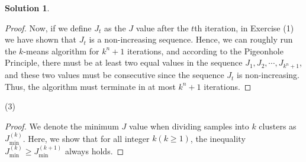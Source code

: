 \documentclass[a4paper,UTF8]{article}
\numberwithin{equation}{section}
\theoremstyle{definition}
\newtheorem*{solution}{Solution}
\begin{document}
\begin{solution}
\begin{proof}
 Now, if we define $J_t$ as the $J$ value after the $t$th iteration, in Exercise (1) we have shown that $J_t$ is a non-increasing sequence. Hence, we can roughly run the $k$-means algorithm for $k^n+1$ iterations, and according to the Pigeonhole Principle, there must be at least two equal values in the sequence $J_1, J_2, \cdots, J_{k^n+1}$, and these two values must be consecutive since the sequence $J_t$ is non-increasing. Thus, the algorithm must terminate in at most $k^n+1$ iterations.
\end{proof}

\item[(3)]
\begin{proof}
We denote the minimum $J$ value when dividing samples into $k$ clusters as $J^{(k)}_{\text{min}}$. Here, we show that for all integer $k(k\geq 1)$, the inequality $J^{(k)}_{\text{min}}\geq J^{(k+1)}_{\text{min}}$ always holds.


\end{proof}
\end{solution}
\end{document}
